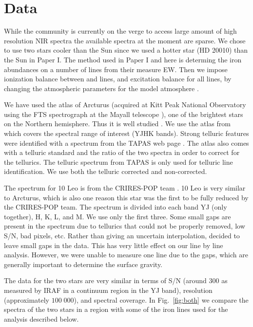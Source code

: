 \documentclass{aa}
\begin{document}
\section{Data}
\label{sec:data}

While the community is currently on the verge to access large amount of high
resolution NIR spectra the available spectra at the moment are sparse. We chose
to use two stars cooler than the Sun since we used a hotter star (HD 20010) than
the Sun in Paper I. The method used in Paper I and here is determing the iron
abundances on a number of lines from their measure EW. Then we impose ionization
balance between  and  lines, and excitation balance for
all  lines, by changing the atmospheric parameters for the model
atmosphere \citep[][is used here]{Kurucz1993}.

We have used the atlas of Arcturus (acquired at Kitt Peak National Observatory
using the FTS spectrograph at the Mayall telescope \citep{Hinkle2003}), one of
the brightest stars on the Northern hemisphere. Thus it is well studied
\citep[see e.g.][to mention just a few]{Griffin1967,McWilliam1990,Ramirez2013}.
We use the atlas from \cite{Hinkle2003} which covers the spectral range of
interest (YJHK bands). Strong telluric features were identified with a spectrum
from the TAPAS web page \citep{Bertaux2014}. The atlas also comes with a
telluric standard and the ratio of the two spectra in order to correct for the
tellurics. The telluric spectrum from TAPAS is only used for telluric line
identification. We use both the telluric corrected and non-corrected.

The spectrum for 10 Leo is from the CRIRES-POP team \citep{Nicholls2016}. 10 Leo
is very similar to Arcturus, which is also one reason this star was the first to
be fully reduced by the CRIRES-POP team. The spectrum is divided into each band
YJ (only together), H, K, L, and M. We use only the first three. Some small gaps
are present in the spectrum due to tellurics that could not be properly removed,
low S/N, bad pixels, etc. Rather than giving an uncertain interpolation,
\citet{Nicholls2016} decided to leave small gaps in the data. This has very
little effect on our line by line analysis. However, we were unable to measure
one  line due to the gaps, which are generally important to
determine the surface gravity.

The data for the two stars are very similar in terms of S/N (around 300 as
measured by IRAF in a continuum region in the YJ band), resolution
(approximately $100\;000$), and spectral coverage. In Fig.~\ref{fig:both} we
compare the spectra of the two stars in a region with some of the iron lines
used for the analysis described below.
\end{document}
